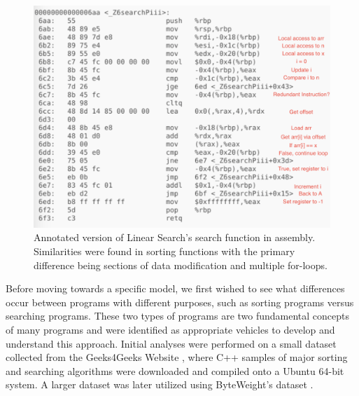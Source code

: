 \begin{figure}
  \includegraphics[width=\linewidth]{./figures/Annotated_search_assembly_ATT.png}
  \caption{Annotated version of Linear Search's search function in assembly. Similarities were found in sorting functions with the primary difference being sections of data modification and multiple for-loops.}
  \label{fig:search}
\end{figure}

Before moving towards a specific model, we first wished to see what differences occur between programs with different purposes, such as sorting programs versus searching programs. These two types of programs are two fundamental concepts of many programs and were identified as appropriate vehicles to develop and understand this approach. Initial analyses were performed on a small dataset collected from the Geeks4Geeks Website \cite{geeks}, where C++ samples of major sorting and searching algorithms were downloaded and compiled onto a Ubuntu 64-bit system. A larger dataset was later utilized using ByteWeight's dataset \cite{bao2014byteweight}. 

